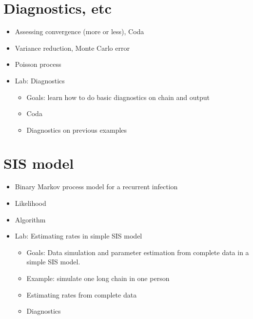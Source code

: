 \documentclass[11pt]{article}
\begin{document}
\section{Diagnostics, etc}
\begin{itemize}
\item Assessing convergence (more or less), Coda 
\item Variance reduction, Monte Carlo error
\item Poisson process 
\item{Lab: Diagnostics}
\begin{itemize}
\item Goals: learn how to do basic diagnostics on chain and output
\item Coda 
\item Diagnostics on previous examples
\end{itemize}
\end{itemize}

\section{SIS model}
\begin{itemize}
\item  Binary Markov process model for a recurrent infection
\item Likelihood
\item Algorithm
\item{Lab: Estimating rates in simple SIS model}
\begin{itemize}
\item Goals: Data simulation and parameter estimation from complete data in a simple SIS model.
\item Example: simulate one long chain in one person
\item Estimating rates from complete data
\item Diagnostics
\end{itemize}
\end{itemize}
\end{document}
